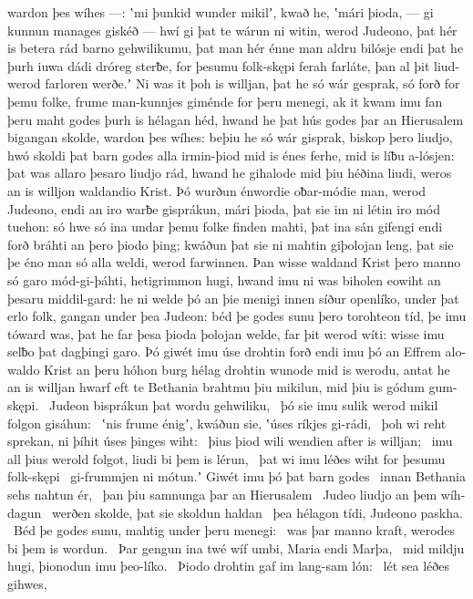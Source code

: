 wardon þes wíhes —: ʽmi þunkid wunder mikilʼ, kwað he,
ʽmári þioda, — gi kunnun manages giskéð —
hwí gi þat te wárun ni witin, werod Judeono,
þat hér is betera rád barno gehwilikumu,
þat man hér énne man aldru bilósje
endi þat he þurh iuwa dádi dróreg sterƀe,
for þesumu folk-skępi ferah farláte,
þan al þit liud-werod farloren werðe.ʼ
Ni was it þoh is willjan, þat he só wár gesprak,
só forð for þemu folke, frume man-kunnjes
giménde for þeru menegi, ak it kwam imu fan þeru maht godes
þurh is hélagan héd, hwand he þat hús godes
þar an Hierusalem bigangan skolde,
wardon þes wíhes: beþiu he só wár gisprak,
biskop þero liudjo, hwó skoldi þat barn godes
alla irmin-þiod mid is énes ferhe,
mid is líƀu a-lósjen: þat was allaro þesaro liudjo rád,
hwand he gihalode mid þiu héðina liudi,
weros an is willjon waldandio Krist.
Þó wurðun énwordie oƀar-módie man,
werod Judeono, endi an iro warƀe gisprákun,
mári þioda, þat sie im ni létin iro mód tuehon:
só hwe só ina undar þemu folke finden mahti,
þat ina sán gifengi endi forð bráhti
an þero þiodo þing; kwáðun þat sie ni mahtin giþolojan leng,
þat sie þe éno man só alla weldi,
werod farwinnen. Þan wisse waldand Krist
þero manno só garo mód-gi-þáhti,
hetigrimmon hugi, hwand imu ni was biholen eowiht
an þesaru middil-gard: he ni welde þó an þie menigi innen
síður openlíko, under þat erlo folk,
gangan under þea Judeon: béd þe godes sunu
þero torohteon tíd, þe imu tóward was,
þat he far þesa þioda þolojan welde,
far þit werod wíti: wisse imu selƀo
þat dagþingi garo. Þó giwét imu úse drohtin forð
endi imu þó an Effrem alo-waldo Krist
an þeru hóhon burg hélag drohtin
wunode mid is werodu, antat he an is willjan hwarf
eft te Bethania brahtmu þiu mikilun,
mid þiu is gódum gum-skępi. \hld\ Judeon bisprákun þat
wordu gehwiliku, \hld\ þó sie imu sulik werod mikil
folgon gisáhun: \hld\ ʽnis frume énigʼ, kwáðun sie,
ʽúses ríkjes gi-rádi, \hld\ þoh wi reht sprekan,
ni þíhit úses þinges wiht: \hld\ þius þiod wili
wendien after is willjan; \hld\ imu all þius werold folgot,
liudi bi þem is lérun, \hld\ þat wi imu léðes wiht
for þesumu folk-skępi \hld\ gi-frummjen ni mótun.ʼ
Giwét imu þó þat barn godes \hld\ innan Bethania
sehs nahtun ér, \hld\ þan þiu samnunga
þar an Hierusalem \hld\ Judeo liudjo
an þem wíh-dagun \hld\ werðen skolde,
þat sie skoldun haldan \hld\ þea hélagon tídi,
Judeono paskha. \hld\ Béd þe godes sunu,
mahtig under þeru menegi: \hld\ was þar manno kraft,
werodes bi þem is wordun. \hld\ Þar gengun ina twé wíf umbi,
Maria endi Marþa, \hld\ mid mildju hugi,
þionodun imu þeo-líko. \hld\ Þiodo drohtin
gaf im lang-sam lón: \hld\ lét sea léðes gihwes,
